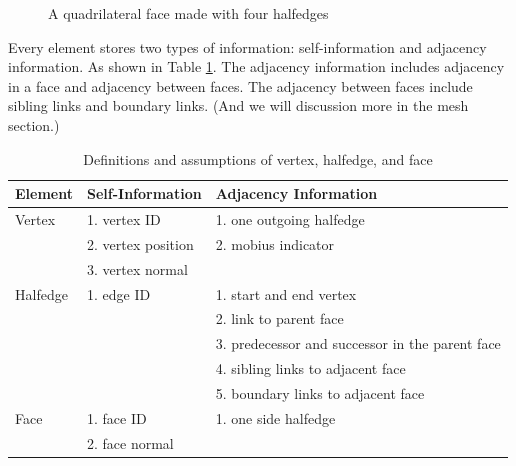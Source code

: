 \documentclass[12pt]{article}
\begin{document}
\begin{figure}[h]
  \centering
  \caption{A quadrilateral face made with four halfedges}
  \label{figure:singleFace}
\end{figure}

Every element stores two types of information: self-information and adjacency information. As shown in Table \ref{table:vhfInfo}. The adjacency information includes adjacency in a face and adjacency between faces. The adjacency between faces include sibling links and boundary links. (And we will discussion more in the mesh section.) 

\begin{table}[ht]
\centering
\begin{tabular}{| l | p{} | p{}|}

\hline
Element & Self-Information & Adjacency Information  \\
\hline
Vertex  & 1. vertex ID & 1. one outgoing halfedge   \\
& 2. vertex position & 2. mobius indicator \\
& 3. vertex normal & \\
\hline
Halfedge & 1. edge ID & 1. start and end vertex\\
& & 2. link to parent face\\
& & 3. predecessor and successor in the parent face\\
& & 4. sibling links to adjacent face\\
& & 5. boundary links to adjacent face \\
\hline
Face    &  1. face ID & 1. one side halfedge\\
& 2. face normal &\\
\hline
\end{tabular}
\caption{Definitions and assumptions of vertex, halfedge, and face} 
\label{table:vhfInfo}
\end{table}
\end{document}

